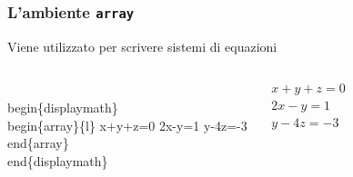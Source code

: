 \documentclass[svgnames,%
	ucs,%
	pdftex]{guitbeamer}
\begin{document}
\begin{frame}
  \frametitle{L'ambiente \texttt{array}}
	Viene utilizzato per scrivere sistemi di equazioni
  \begin{columns}
	\begin{LaTeXcode}
		\\begin\{displaymath\} \n
		\alert{\\begin\{array\}\{l\}} \n
		\hspace*{5ex} x+y+z=0\bs\bs \n
		\hspace*{5ex} 2x-y=1\bs\bs \n
		\hspace*{5ex} y-4z=-3 \n
		\alert{\\end\{array\}} \n
		\\end\{displaymath\} 
	\end{LaTeXcode}
	\begin{LaTeXoutput}
		\vspace{4.6ex}
		\begin{displaymath} 
		\begin{array}{l}
		x+y+z=0\\
		2x-y=1\\
		y-4z=-3 
		\end{array} 
		\end{displaymath} 
		\vspace{4.6ex}
	\end{LaTeXoutput}
  \end{columns}
\end{frame}
\end{document}
